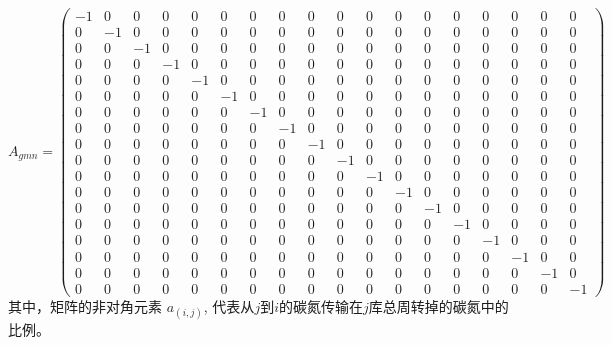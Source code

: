       \begin{equation}
        A_{gmn}=\left(\begin{array}{rrrrrrrrrrrrrrrrrrrrrrrrrrrrrr}
          -1 & 0 & 0 & 0 & 0 & 0 & 0 & 0 & 0 & 0 & 0 & 0 & 0 & 0 & 0 & 0 & 0 & 0 \\
           0 & -1 & 0 & 0 & 0 & 0 & 0 & 0 & 0 & 0 & 0 & 0 & 0 & 0 & 0 & 0 & 0 & 0 \\ 
           0 & 0 & -1 & 0 & 0 & 0 & 0 & 0 & 0 & 0 & 0 & 0 & 0 & 0 & 0 & 0 & 0 & 0 \\ 
           0 & 0 & 0 & -1 & 0 & 0 & 0 & 0 & 0 & 0 & 0 & 0 & 0 & 0 & 0 & 0 & 0 & 0 \\ 
           0 & 0 & 0 & 0 & -1 & 0 & 0 & 0 & 0 & 0 & 0 & 0 & 0 & 0 & 0 & 0 & 0 & 0 \\
           0 & 0 & 0 & 0 & 0 & -1 & 0 & 0 & 0 & 0 & 0 & 0 & 0 & 0 & 0 & 0 & 0 & 0 \\ 
           0 & 0 & 0 & 0 & 0 & 0 & -1 & 0 & 0 & 0 & 0 & 0 & 0 & 0 & 0 & 0 & 0 & 0 \\ 
           0 & 0 & 0 & 0 & 0 & 0 & 0 & -1 & 0 & 0 & 0 & 0 & 0 & 0 & 0 & 0 & 0 & 0 \\ 
           0 & 0 & 0 & 0 & 0 & 0 & 0 & 0 & -1 & 0 & 0 & 0 & 0 & 0 & 0 & 0 & 0 & 0 \\ 
           0 & 0 & 0 & 0 & 0 & 0 & 0 & 0 & 0 & -1 & 0 & 0 & 0 & 0 & 0 & 0 & 0 & 0 \\ 
           0 & 0 & 0 & 0 & 0 & 0 & 0 & 0 & 0 & 0 & -1 & 0 & 0 & 0 & 0 & 0 & 0 & 0 \\ 
           0 & 0 & 0 & 0 & 0 & 0 & 0 & 0 & 0 & 0 & 0 & -1 & 0 & 0 & 0 & 0 & 0 & 0 \\ 
           0 & 0 & 0 & 0 & 0 & 0 & 0 & 0 & 0 & 0 & 0 & 0 & -1 & 0 & 0 & 0 & 0 & 0 \\ 
           0 & 0 & 0 & 0 & 0 & 0 & 0 & 0 & 0 & 0 & 0 & 0 & 0 & -1 & 0 & 0 & 0 & 0 \\ 
           0 & 0 & 0 & 0 & 0 & 0 & 0 & 0 & 0 & 0 & 0 & 0 & 0 & 0 & -1 & 0 & 0 & 0 \\
           0 & 0 & 0 & 0 & 0 & 0 & 0 & 0 & 0 & 0 & 0 & 0 & 0 & 0 & 0 & -1 & 0 & 0 \\ 
           0 & 0 & 0 & 0 & 0 & 0 & 0 & 0 & 0 & 0 & 0 & 0 & 0 & 0 & 0 & 0 & -1 &0 \\
           0 & 0 & 0 & 0 & 0 & 0 & 0 & 0 & 0 & 0 & 0 & 0 & 0 & 0 & 0 & 0 & 0 & -1\end{array}\right)
        \end{equation}
其中，矩阵的非对角元素 $a_{(i,j)}$, 代表从$j$到$i$的碳氮传输在$j$库总周转掉的碳氮中的比例。


